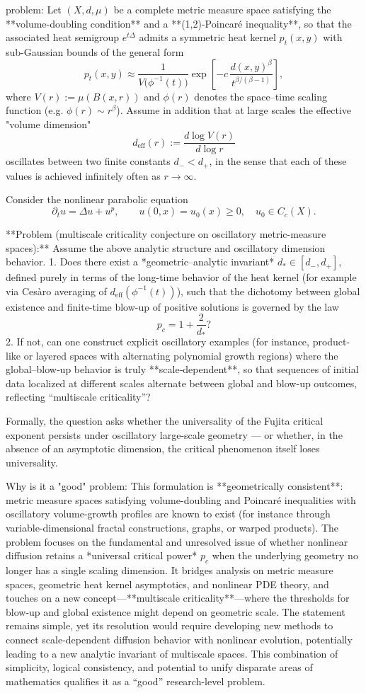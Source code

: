 problem:  
Let \((X,d,\mu)\) be a complete metric measure space satisfying the **volume-doubling condition** and a **(1,2)-Poincaré inequality**, so that the associated heat semigroup \(e^{t\Delta}\) admits a symmetric heat kernel \(p_t(x,y)\) with sub-Gaussian bounds of the general form  
\[
p_t(x,y) \approx \frac{1}{V\big(\phi^{-1}(t)\big)}\exp\!\left[-c\,\frac{d(x,y)^{\beta}}{t^{\beta/(\beta-1)}}\right],
\]
where \(V(r):=\mu(B(x,r))\) and \(\phi(r)\) denotes the space–time scaling function (e.g. \(\phi(r)\sim r^{\beta}\)).  
Assume in addition that at large scales the effective "volume dimension"  
\[
d_{\mathrm{eff}}(r) := \frac{d\log V(r)}{d\log r}
\]
oscillates between two finite constants \(d_-<d_+\), in the sense that each of these values is achieved infinitely often as \(r\to\infty\).

Consider the nonlinear parabolic equation
\[
\partial_t u = \Delta u + u^p, \qquad u(0,x)=u_0(x)\ge0, \quad u_0\in C_c(X).
\]

**Problem (multiscale criticality conjecture on oscillatory metric-measure spaces):**  
Assume the above analytic structure and oscillatory dimension behavior.  
1. Does there exist a *geometric–analytic invariant* \(d_*\in[d_-,d_+]\), defined purely in terms of the long-time behavior of the heat kernel (for example via Cesàro averaging of \(d_{\mathrm{eff}}(\phi^{-1}(t))\)), such that the dichotomy between global existence and finite-time blow-up of positive solutions is governed by the law
\[
p_c = 1 + \frac{2}{d_*}?
\]
2. If not, can one construct explicit oscillatory examples (for instance, product-like or layered spaces with alternating polynomial growth regions) where the global–blow‐up behavior is truly **scale‐dependent**, so that sequences of initial data localized at different scales alternate between global and blow-up outcomes, reflecting “multiscale criticality”?

Formally, the question asks whether the universality of the Fujita critical exponent persists under oscillatory large-scale geometry — or whether, in the absence of an asymptotic dimension, the critical phenomenon itself loses universality.

Why is it a "good" problem:  
This formulation is **geometrically consistent**: metric measure spaces satisfying volume-doubling and Poincaré inequalities with oscillatory volume-growth profiles are known to exist (for instance through variable-dimensional fractal constructions, graphs, or warped products). The problem focuses on the fundamental and unresolved issue of whether nonlinear diffusion retains a *universal critical power* \(p_c\) when the underlying geometry no longer has a single scaling dimension.  
It bridges analysis on metric measure spaces, geometric heat kernel asymptotics, and nonlinear PDE theory, and touches on a new concept—**multiscale criticality**—where the thresholds for blow-up and global existence might depend on geometric scale. The statement remains simple, yet its resolution would require developing new methods to connect scale-dependent diffusion behavior with nonlinear evolution, potentially leading to a new analytic invariant of multiscale spaces. This combination of simplicity, logical consistency, and potential to unify disparate areas of mathematics qualifies it as a “good” research-level problem.
